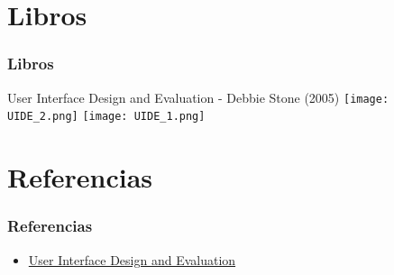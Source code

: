 \documentclass[11pt]{beamer}
\begin{document}
\section{Libros}
\begin{frame}
\frametitle{Libros}
\item User Interface Design and Evaluation - Debbie Stone (2005)
{\texttt{[image: UIDE\_2.png]}}
{\texttt{[image: UIDE\_1.png]}}

\end{frame}



\section{Referencias}
\begin{frame}
\frametitle{Referencias}
\begin{itemize}
\item \href{https://studylib.net/doc/25182344/-debbie-stone--caroline-jarrett--mark-woodroffe--s-bookfi-}{User Interface Design and Evaluation}
\end{itemize}
\end{frame}
\end{document}
